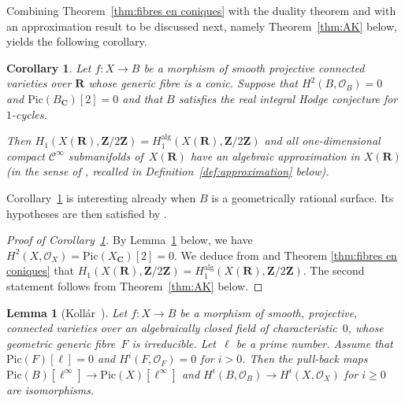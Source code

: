 \documentclass[JEP,XML,SOM,Unicode]{cedram}
\theoremstyle{plain}
\newtheorem{lem}[thm]{Lemma}
\newtheorem{cor}[thm]{Corollary}
\theoremstyle{definition}
\numberwithin{equation}{section}
\newcommand{\alg}{{\mathrm{alg}}}
\newcommand{\sO}{{\mathscr O}}
\renewcommand{\C}{{\mathbf C}}
\newcommand{\R}{{\mathbf R}}
\newcommand{\Z}{{\mathbf Z}}
\newcommand{\Pic}{\mathrm{Pic}}
\newcommand{\ci}{\mathscr{C}^{\infty}}
\begin{document}
Combining Theorem~\ref{thm:fibres en coniques} with the duality theorem \cite[Th.\,\ref*{BW1-th:nohodgetheoreticob}]{BW1}
and with an approximation result to be discussed next, namely Theorem~\ref{thm:AK} below,
yields the following corollary.

\begin{cor}
\label{cor:approxconiques}
Let $f:X\to B$ be a morphism of smooth projective connected varieties over $\R$ whose generic fibre is a conic.
Suppose that $H^2(B,\sO_B)=0$ and $\Pic(B_{\C})[2]=0$ and that $B$ satisfies the real integral Hodge conjecture for $1$-cycles.

Then $H_1(X(\R),\Z/2\Z)=H_1^\alg(X(\R),\Z/2\Z)$ and all one-dimensional compact $\ci$ submanifolds of~$X(\R)$
have an algebraic approximation in $X(\R)$ (in the sense of
\cite[Def.\,12.4.10]{bcr},
recalled in Definition~\ref{def:approximation} below).
\end{cor}

Corollary~\ref{cor:approxconiques} is interesting already when $B$ is a geometrically rational surface. Its hypotheses are then satisfied by \cite[Prop.\,\ref*{BW1-prop:real(1,1)}]{BW1}.

\begin{proof}[Proof of Corollary~\ref{cor:approxconiques}]
By Lemma~\ref{lem:Hi0 Pictors} below, we have \hbox{$H^2(X,\sO_X)\!=\!\Pic(X_{\C})[2]\!=\!0$}.
We deduce from \cite[Th.\,\ref*{BW1-th:nohodgetheoreticob}]{BW1} and Theorem \ref{thm:fibres en coniques} that $H_1(X(\R),\Z/2\Z)=H_1^\alg(X(\R),\Z/2\Z)$. The second statement follows from Theorem~\ref{thm:AK} below.
\end{proof}

\newcommand{\citekollarpictors}{Koll\'ar~\cite{kollartorsionfree,kollarshaf}}
\begin{lem}[\citekollarpictors]
\label{lem:Hi0 Pictors}
Let $f:X\to B$ be a morphism of smooth, projective, connected varieties over an algebraically
closed field of characteristic~$0$,
whose geometric
generic fibre~$F$
is irreducible. Let~$\ell$ be a prime number.
Assume that $\Pic(F)[\ell]=0$ and $H^i(F,\sO_F)=0$ for $i>0$.
Then the pull-back maps $\Pic(B)[\ell^\infty]\to \Pic(X)[\ell^\infty]$
and $H^i(B,\sO_B)\to H^i(X,\sO_X)$ for $i\geq 0$
are isomorphisms.
\end{lem}
\end{document}
